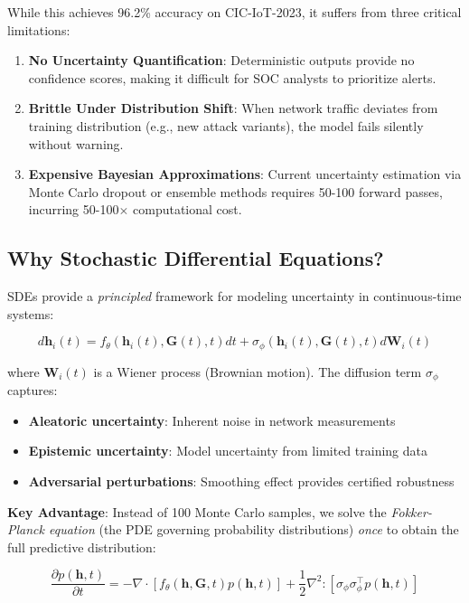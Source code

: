 \documentclass[11pt]{article}
\begin{document}
While this achieves 96.2\% accuracy on CIC-IoT-2023, it suffers from three critical limitations:

\begin{enumerate}[leftmargin=*]
    \item \textbf{No Uncertainty Quantification}: Deterministic outputs provide no confidence scores, making it difficult for SOC analysts to prioritize alerts.
    \item \textbf{Brittle Under Distribution Shift}: When network traffic deviates from training distribution (e.g., new attack variants), the model fails silently without warning.
    \item \textbf{Expensive Bayesian Approximations}: Current uncertainty estimation via Monte Carlo dropout or ensemble methods requires 50-100 forward passes, incurring 50-100$\times$ computational cost.
\end{enumerate}

\subsection{Why Stochastic Differential Equations?}

SDEs provide a \textit{principled} framework for modeling uncertainty in continuous-time systems:

\begin{equation}
d\mathbf{h}_i(t) = f_\theta(\mathbf{h}_i(t), \mathbf{G}(t), t) dt + \sigma_\phi(\mathbf{h}_i(t), \mathbf{G}(t), t) d\mathbf{W}_i(t)
\end{equation}

where $\mathbf{W}_i(t)$ is a Wiener process (Brownian motion). The diffusion term $\sigma_\phi$ captures:
\begin{itemize}
    \item \textbf{Aleatoric uncertainty}: Inherent noise in network measurements
    \item \textbf{Epistemic uncertainty}: Model uncertainty from limited training data
    \item \textbf{Adversarial perturbations}: Smoothing effect provides certified robustness
\end{itemize}

\textbf{Key Advantage}: Instead of 100 Monte Carlo samples, we solve the \textit{Fokker-Planck equation} (the PDE governing probability distributions) \textit{once} to obtain the full predictive distribution:

\begin{equation}
\frac{\partial p(\mathbf{h}, t)}{\partial t} = -\nabla \cdot \left[f_\theta(\mathbf{h}, \mathbf{G}, t) p(\mathbf{h}, t)\right] + \frac{1}{2} \nabla^2 : \left[\sigma_\phi \sigma_\phi^\top p(\mathbf{h}, t)\right]
\end{equation}
\end{document}
